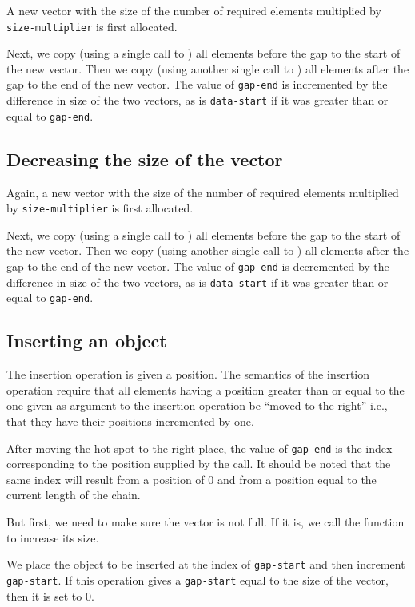 \documentclass[11pt]{article}
\begin{document}
A new vector with the size of the number of required elements
multiplied by \texttt{size-multiplier} is first allocated.

Next, we copy (using a single call to ) all elements
before the gap to the start of the new vector.  Then we copy (using
another single call to ) all elements after the gap to the
end of the new vector. The value of \texttt{gap-end} is incremented by
the difference in size of the two vectors, as is \texttt{data-start}
if it was greater than or equal to \texttt{gap-end}.

\subsection{Decreasing the size of the vector}

Again, a new vector with the size of the number of required elements
multiplied by \texttt{size-multiplier} is first allocated.

Next, we copy (using a single call to ) all elements
before the gap to the start of the new vector.  Then we copy (using
another single call to ) all elements after the gap to the
end of the new vector. The value of \texttt{gap-end} is decremented by
the difference in size of the two vectors, as is \texttt{data-start}
if it was greater than or equal to \texttt{gap-end}.

\subsection{Inserting an object}

The insertion operation is given a position.  The semantics of the
insertion operation require that all elements having a position
greater than or equal to the one given as argument to the insertion
operation be ``moved to the right'' i.e., that they have their
positions incremented by one.

After moving the hot spot to the right place, the value of
\texttt{gap-end} is the index corresponding to the position supplied
by the call.  It should be noted that the same index will result from
a position of $0$ and from a position equal to the current length of
the chain.

But first, we need to make sure the vector is not full.  If it is, we
call the function to increase its size.

We place the object to be inserted at the index of \texttt{gap-start}
and then increment \texttt{gap-start}.  If this operation gives a
\texttt{gap-start} equal to the size of the vector, then it is set to
$0$.
\end{document}
